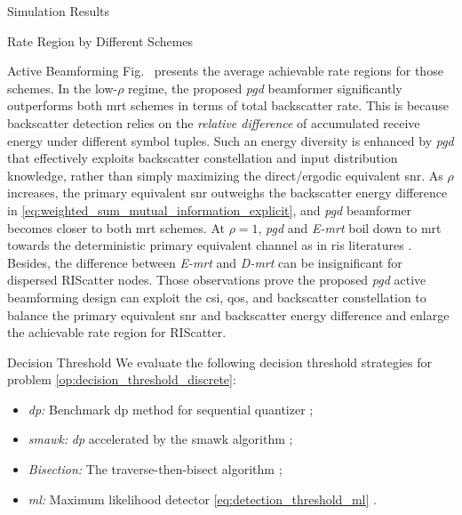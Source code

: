 \documentclass[journal,12pt,onecolumn,draftclsnofoot]{IEEEtran}
\theoremstyle{remark}
\begin{document}
\begin{section}{Simulation Results}
\begin{subsection}{Rate Region by Different Schemes}
\begin{subsubsection}{Active Beamforming}
			Fig.~ presents the average achievable rate regions for those schemes.
			In the low-$\rho$ regime, the proposed \emph{\gls{pgd}} beamformer significantly outperforms both \gls{mrt} schemes in terms of total backscatter rate.
			This is because backscatter detection relies on the \emph{relative difference} of accumulated receive energy under different symbol tuples.
			Such an energy diversity is enhanced by \emph{\gls{pgd}} that effectively exploits backscatter constellation and input distribution knowledge, rather than simply maximizing the direct/ergodic equivalent \gls{snr}.
			As $\rho$ increases, the primary equivalent \gls{snr} outweighs the backscatter energy difference in \eqref{eq:weighted_sum_mutual_information_explicit}, and \emph{\gls{pgd}} beamformer becomes closer to both \gls{mrt} schemes.
			At $\rho=1$, \emph{\gls{pgd}} and \emph{E-\gls{mrt}} boil down to \gls{mrt} towards the deterministic primary equivalent channel as in \gls{ris} literatures \cite{Wu2019}.
			Besides, the difference between \emph{E-\gls{mrt}} and \emph{D-\gls{mrt}} can be insignificant for dispersed RIScatter nodes.
			Those observations prove the proposed \emph{\gls{pgd}} active beamforming design can exploit the \gls{csi}, \gls{qos}, and backscatter constellation to balance the primary equivalent \gls{snr} and backscatter energy difference and enlarge the achievable rate region for RIScatter.
		\end{subsubsection}

		\begin{subsubsection}{Decision Threshold}
			We evaluate the following decision threshold strategies for problem \eqref{op:decision_threshold_discrete}:
			\begin{itemize}
				\item \emph{\gls{dp}:} Benchmark \gls{dp} method for sequential quantizer \cite{He2021};
				\item \emph{\gls{smawk}:} \emph{\gls{dp}} accelerated by the \gls{smawk} algorithm \cite{He2021};
				\item \emph{Bisection:} The traverse-then-bisect algorithm \cite{Nguyen2020a};
				\item \emph{\gls{ml}:} Maximum likelihood detector \eqref{eq:detection_threshold_ml} \cite{Qian2019}.
			\end{itemize}


\end{subsubsection}
\end{subsection}
\end{section}
\end{document}
